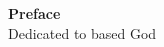 \vspace*{\fill}
  \begin{center}
    \textbf{Preface}\\
    Dedicated to based God
  \end{center}
\vspace*{\fill}
\pagebreak